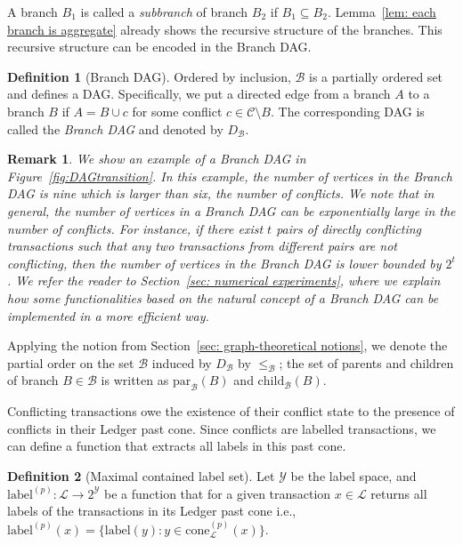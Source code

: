\documentclass[11pt]{article}
\newcommand{\lab}{\mathrm{label}}
\newcommand{\branchset}{\mathcal{B}}
\newcommand{\conflictset}{\mathcal{C}}
\newcommand{\ledger}{\mathcal{L}}
\newcommand{\BranchDAG}{D_{\branchset}}
\newcommand{\cone}[3]{\mathrm{cone}_{#2}^{(#1)}\left(#3\right)}
\newcommand{\parent}[2]{\mathrm{par}_{#1}\left(#2\right)}
\newcommand{\child}[2]{\mathrm{child}_{#1}\left(#2\right)}
\theoremstyle{plain}
\newtheorem{remark}{Remark}
\theoremstyle{definition}
\newtheorem{definition}{Definition}
\numberwithin{definition}{section}
\numberwithin{lemma}{section}
\numberwithin{ass}{section}
\numberwithin{remark}{section}
\numberwithin{example}{section}
\numberwithin{proposition}{section}
\numberwithin{theorem}{section}
\begin{document}
A branch ${B}_1$ is called a \emph{subbranch} of branch ${B}_2$ if ${B}_1\subseteq {B}_2$. Lemma~\ref{lem: each branch is aggregate} already shows the recursive structure of the branches. 
This recursive structure can be encoded in the Branch DAG.


\begin{definition}[Branch DAG]\label{def:branchDAG}
Ordered by inclusion, $\branchset$ is a partially ordered set 
and defines a DAG. 
 Specifically, we put a directed edge from a branch $A$ to a branch $B$ if $A = {B}\cup c$ for some conflict $c\in \conflictset \setminus {B}$. The corresponding DAG is called the \emph{Branch DAG} and denoted by $\BranchDAG$.
\end{definition}

\begin{remark}\label{rem: complexity of Branch DAG}
We show an example of a Branch DAG in Figure~\ref{fig:DAGtransition}. In this example, the number of vertices in the Branch DAG is nine  which is larger than six, the number of conflicts. We note that in general, the number of vertices in a Branch DAG can be exponentially large in the number of conflicts. For instance, if there exist $t$ pairs of directly conflicting transactions such that any two transactions from different pairs are not conflicting, then the number of vertices in the Branch DAG is lower bounded by $2^t$. We refer the reader to Section~\ref{sec: numerical experiments}, where we explain how some functionalities based on the natural concept of a Branch DAG can be implemented in a more efficient way.
\end{remark}

Applying the notion from Section~\ref{sec: graph-theoretical notions}, we denote the partial order on the set $\branchset$ induced by $\BranchDAG$ by $\le_{\branchset}$; the set of parents and children of branch $B\in\branchset$ is written as $\parent{\branchset}{B}$ and $\child{\branchset}{B}$.


Conflicting transactions owe the existence of their conflict state to the presence of conflicts in their Ledger past cone. Since conflicts are labelled transactions, we can define a function that extracts all labels in this past cone. 
\begin{definition}[Maximal contained label set]\label{def:label set}
Let $\mathcal{Y}$ be the label space, and $\lab^{(p)}: \ledger \to 2^\mathcal{Y}$ be a function that for a given transaction $x\in \ledger$ returns all labels of the transactions in its Ledger past cone i.e., $\lab^{(p)}(x)=\{\lab(y): y\in \cone{p}{\ledger}{x}\}$. 
\end{definition}
\end{document}
